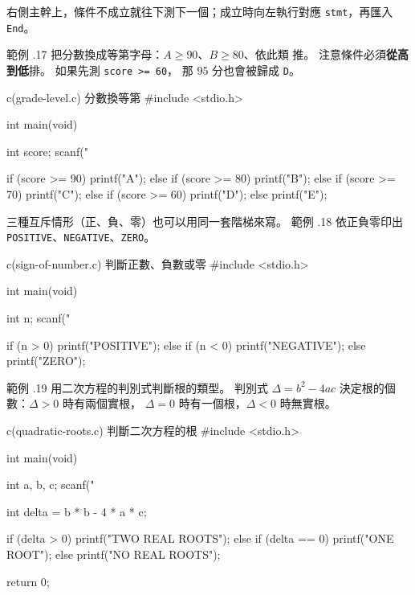右側主幹上，條件不成立就往下測下一個；成立時向左執行對應
\texttt{stmt}，再匯入 \texttt{End}。

範例 \thechapter.17 把分數換成等第字母：$A \ge 90$、$B \ge 80$、依此類
推。 注意條件必須\textbf{從高到低}排。 如果先測 \texttt{score >= 60}，
那 $95$ 分也會被歸成 \texttt{D}。

\begin{example}{c}{(grade-level.c) 分數換等第}
#include <stdio.h>

int main(void) {
    int score;
    scanf("%

    if (score >= 90) {
        printf("A\n");
    } else if (score >= 80) {
        printf("B\n");
    } else if (score >= 70) {
        printf("C\n");
    } else if (score >= 60) {
        printf("D\n");
    } else {
        printf("E\n");
    }
}
\end{example}


三種互斥情形（正、負、零）也可以用同一套階梯來寫。 範例 \thechapter.18
依正負零印出 \texttt{POSITIVE}、\texttt{NEGATIVE}、\texttt{ZERO}。

\begin{example}{c}{(sign-of-number.c) 判斷正數、負數或零}
#include <stdio.h>

int main(void) {
    int n;
    scanf("%

    if (n > 0) {
        printf("POSITIVE\n");
    } else if (n < 0) {
        printf("NEGATIVE\n");
    } else {
        printf("ZERO\n");
    }
}
\end{example}


範例 \thechapter.19 用二次方程的判別式判斷根的類型。 判別式
$\Delta = b^2 - 4ac$ 決定根的個數：$\Delta > 0$ 時有兩個實根，
$\Delta = 0$ 時有一個根，$\Delta < 0$ 時無實根。

\begin{example}{c}{(quadratic-roots.c) 判斷二次方程的根}
#include <stdio.h>

int main(void) {
    int a, b, c;
    scanf("%

    int delta = b * b - 4 * a * c;

    if (delta > 0) {
        printf("TWO REAL ROOTS\n");
    } else if (delta == 0) {
        printf("ONE ROOT\n");
    } else {
        printf("NO REAL ROOTS\n");
    }

    return 0;
}
\end{example}

